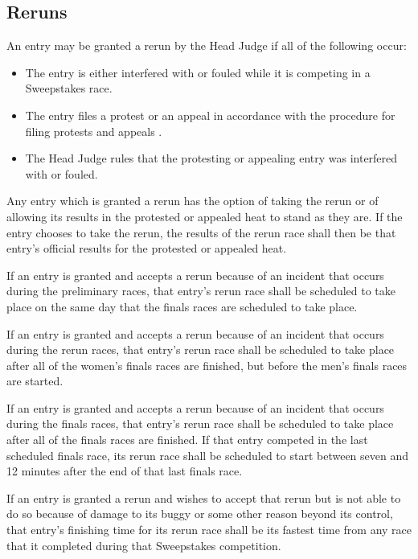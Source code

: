 \subsection{Reruns}

	An entry may be granted a rerun by the Head Judge if all of the following
	occur:
		
	\begin{itemize}

		\item The entry is either interfered with or fouled while it is competing
		in a Sweepstakes race.

		\item The entry files a protest or an appeal in accordance with the
		procedure for filing protests and appeals .

		\item The Head Judge rules that the protesting or appealing entry was
		interfered with or fouled.

	\end{itemize}

	Any entry which is granted a rerun has the option of taking the rerun or of
	allowing its results in the protested or appealed heat to stand as they are. If
	the entry chooses to take the rerun, the results of the rerun race shall then
	be that entry's official results for the protested or appealed heat.

	If an entry is granted and accepts a rerun because of an incident that occurs
	during the preliminary races, that entry's rerun race shall be scheduled to
	take place on the same day that the finals races are scheduled to take place.

	If an entry is granted and accepts a rerun because of an incident that occurs
	during the rerun races, that entry's rerun race shall be scheduled to take
	place after all of the women's finals races are finished, but before the men's
	finals races are started.

	If an entry is granted and accepts a rerun because of an incident that occurs
	during the finals races, that entry's rerun race shall be scheduled to take
	place after all of the finals races are finished. If that entry competed in the
	last scheduled finals race, its rerun race shall be scheduled to start between
	seven and 12 minutes after the end of that last finals race.

	If an entry is granted a rerun and wishes to accept that rerun but is not able
	to do so because of damage to its buggy or some other reason beyond its
	control, that entry's finishing time for its rerun race shall be its fastest
	time from any race that it completed during that Sweepstakes competition.
	

